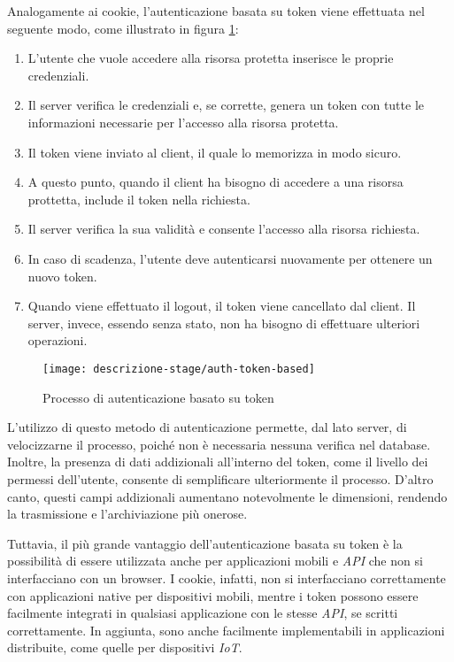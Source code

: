 \noindent Analogamente ai cookie, l'autenticazione basata su token viene effettuata nel seguente modo, come illustrato in figura \ref{fig:auth-token-based}:
\begin{enumerate}
	\item L'utente che vuole accedere alla risorsa protetta inserisce le proprie credenziali.
	\item Il server verifica le credenziali e, se corrette, genera un token con tutte le informazioni necessarie per l'accesso alla risorsa protetta.
	\item Il token viene inviato al client, il quale lo memorizza in modo sicuro.
	\item A questo punto, quando il client ha bisogno di accedere a una risorsa prottetta, include il token nella richiesta.
	\item Il server verifica la sua validità e consente l'accesso alla risorsa richiesta. 
	\item In caso di scadenza, l'utente deve autenticarsi nuovamente per ottenere un nuovo token.
	\item Quando viene effettuato il logout, il token viene cancellato dal client. Il server, invece, essendo senza stato, non ha bisogno di effettuare ulteriori operazioni.
\end{enumerate}

\begin{figure}[!ht] 
	\centering 
	\texttt{[image: descrizione-stage/auth-token-based]} 
	\caption{Processo di autenticazione basato su token}
	\label{fig:auth-token-based}
\end{figure}

\noindent L'utilizzo di questo metodo di autenticazione permette, dal lato server, di velocizzarne il processo, poiché non è necessaria nessuna verifica nel database.
Inoltre, la presenza di dati addizionali all'interno del token, come il livello dei permessi dell'utente, consente di semplificare ulteriormente il processo.
D'altro canto, questi campi addizionali aumentano notevolmente le dimensioni, rendendo la trasmissione e l'archiviazione più onerose.

Tuttavia, il più grande vantaggio dell'autenticazione basata su token è la possibilità di essere utilizzata anche per applicazioni mobili e \emph{API} che non si interfacciano con un browser.
I cookie, infatti, non si interfacciano correttamente con applicazioni native per dispositivi mobili, mentre i token possono essere facilmente integrati in qualsiasi applicazione con le stesse \emph{API}, se scritti correttamente.
In aggiunta, sono anche facilmente implementabili in applicazioni distribuite, come quelle per dispositivi \emph{IoT}.\\

